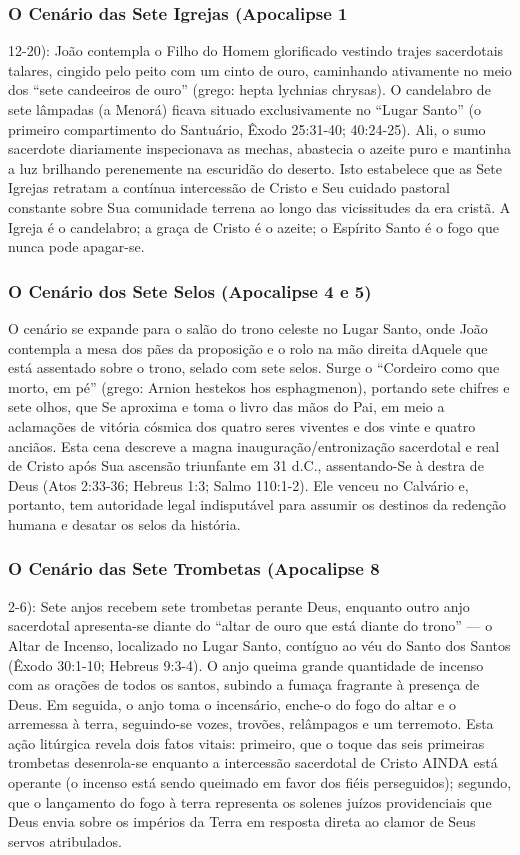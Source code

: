 \subsubsection*{O Cenário das Sete Igrejas (Apocalipse 1}
12-20):
João contempla o Filho do Homem glorificado vestindo trajes sacerdotais talares, cingido pelo peito com um cinto de ouro, caminhando ativamente no meio dos ``sete candeeiros de ouro'' (grego: hepta lychnias chrysas). O candelabro de sete lâmpadas (a Menorá) ficava situado exclusivamente no ``Lugar Santo'' (o primeiro compartimento do Santuário, Êxodo 25:31-40; 40:24-25). Ali, o sumo sacerdote diariamente inspecionava as mechas, abastecia o azeite puro e mantinha a luz brilhando perenemente na escuridão do deserto. Isto estabelece que as Sete Igrejas retratam a contínua intercessão de Cristo e Seu cuidado pastoral constante sobre Sua comunidade terrena ao longo das vicissitudes da era cristã. A Igreja é o candelabro; a graça de Cristo é o azeite; o Espírito Santo é o fogo que nunca pode apagar-se.


\subsubsection*{O Cenário dos Sete Selos (Apocalipse 4 e 5)}
O cenário se expande para o salão do trono celeste no Lugar Santo, onde João contempla a mesa dos pães da proposição e o rolo na mão direita dAquele que está assentado sobre o trono, selado com sete selos. Surge o ``Cordeiro como que morto, em pé'' (grego: Arnion hestekos hos esphagmenon), portando sete chifres e sete olhos, que Se aproxima e toma o livro das mãos do Pai, em meio a aclamações de vitória cósmica dos quatro seres viventes e dos vinte e quatro anciãos. Esta cena descreve a magna inauguração/entronização sacerdotal e real de Cristo após Sua ascensão triunfante em 31 d.C., assentando-Se à destra de Deus (Atos 2:33-36; Hebreus 1:3; Salmo 110:1-2). Ele venceu no Calvário e, portanto, tem autoridade legal indisputável para assumir os destinos da redenção humana e desatar os selos da história.


\subsubsection*{O Cenário das Sete Trombetas (Apocalipse 8}
2-6):
Sete anjos recebem sete trombetas perante Deus, enquanto outro anjo sacerdotal apresenta-se diante do ``altar de ouro que está diante do trono'' — o Altar de Incenso, localizado no Lugar Santo, contíguo ao véu do Santo dos Santos (Êxodo 30:1-10; Hebreus 9:3-4). O anjo queima grande quantidade de incenso com as orações de todos os santos, subindo a fumaça fragrante à presença de Deus. Em seguida, o anjo toma o incensário, enche-o do fogo do altar e o arremessa à terra, seguindo-se vozes, trovões, relâmpagos e um terremoto. Esta ação litúrgica revela dois fatos vitais: primeiro, que o toque das seis primeiras trombetas desenrola-se enquanto a intercessão sacerdotal de Cristo AINDA está operante (o incenso está sendo queimado em favor dos fiéis perseguidos); segundo, que o lançamento do fogo à terra representa os solenes juízos providenciais que Deus envia sobre os impérios da Terra em resposta direta ao clamor de Seus servos atribulados.


